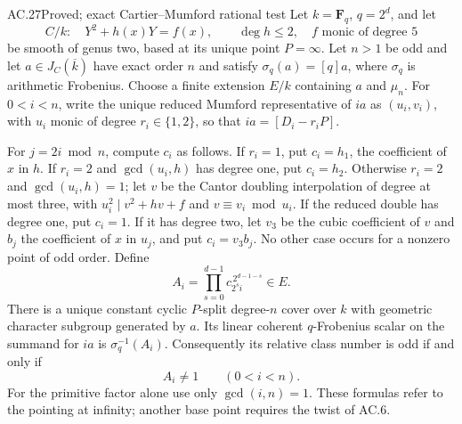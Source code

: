 \begin{claim}{AC.27}{Proved; exact Cartier--Mumford rational test}
Let $k=\mathbf F_q$, $q=2^d$, and let
\[
 C/k:\quad Y^2+h(x)Y=f(x),\qquad \deg h\le2,
 \quad f\text{ monic of degree }5
\]
be smooth of genus two, based at its unique point $P=\infty$.
Let $n>1$ be odd and let $a\in J_C(\overline k)$ have exact order
$n$ and satisfy $\sigma_q(a)=[q]a$, where $\sigma_q$ is arithmetic
Frobenius. Choose a finite extension $E/k$ containing $a$ and $\mu_n$.
For $0<i<n$, write the unique reduced Mumford representative of $ia$
as $(u_i,v_i)$, with $u_i$ monic of degree $r_i\in\{1,2\}$, so that
$ia=[D_i-r_iP]$.

For $j=2i\bmod n$, compute $c_i$ as follows.
If $r_i=1$, put $c_i=h_1$, the coefficient of $x$ in $h$.
If $r_i=2$ and $\gcd(u_i,h)$ has degree one, put $c_i=h_2$.
Otherwise $r_i=2$ and $\gcd(u_i,h)=1$; let $v$ be the Cantor
doubling interpolation of degree at most three, with
$u_i^2\mid v^2+hv+f$ and $v\equiv v_i\bmod u_i$.
If the reduced double has degree one, put $c_i=1$.
If it has degree two, let $v_3$ be the cubic coefficient of $v$
and $b_j$ the coefficient of $x$ in $u_j$, and put $c_i=v_3b_j$.
No other case occurs for a nonzero point of odd order. Define
\[
 A_i=\prod_{s=0}^{d-1}c_{2^s i}^{\,2^{d-1-s}}\in E.       \tag{AC.14}
\]
There is a unique constant cyclic $P$-split degree-$n$ cover over $k$
with geometric character subgroup generated by $a$.
Its linear coherent $q$-Frobenius scalar on the summand for $ia$ is
$\sigma_q^{-1}(A_i)$. Consequently its relative class number is odd
if and only if
\[
                         A_i\ne1\qquad(0<i<n).           \tag{AC.15}
\]
For the primitive factor alone use only $\gcd(i,n)=1$.
These formulas refer to the pointing at infinity; another base point
requires the twist of AC.6.
\end{claim}
